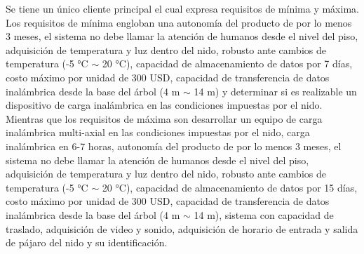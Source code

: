Se tiene un único cliente principal el cual expresa requisitos de mínima y máxima. Los requisitos de mínima engloban una autonomía del producto de por lo menos 3 meses, el sistema no debe llamar la atención de humanos desde el nivel del piso, adquisición de temperatura y luz dentro del nido, robusto ante cambios de temperatura (-5 °C $\sim$ 20 °C), capacidad de almacenamiento de datos por 7 días, costo máximo por unidad de 300 USD, capacidad de transferencia de datos inalámbrica desde la base del árbol (4 m $\sim$ 14 m) y determinar si es realizable un dispositivo de carga inalámbrica en las condiciones impuestas por el nido. Mientras que los requisitos de máxima son desarrollar un equipo de carga inalámbrica multi-axial en las condiciones impuestas por el nido, carga inalámbrica en 6-7 horas, autonomía del producto de por lo menos 3 meses, el sistema no debe llamar la atención de humanos desde el nivel del piso, adquisición de temperatura y luz dentro del nido, robusto ante cambios de temperatura (-5 °C $\sim$ 20 °C), capacidad de almacenamiento de datos por 15 días, costo máximo por unidad de 300 USD, capacidad de transferencia de datos inalámbrica desde la base del árbol (4 m $\sim$ 14 m), sistema con capacidad de traslado, adquisición de video y sonido, adquisición de horario de entrada y salida de pájaro del nido y su identificación.

\label{sec:RelevamientoDatos}


%

\label{sec:RequerimientosTrazabilidad}

